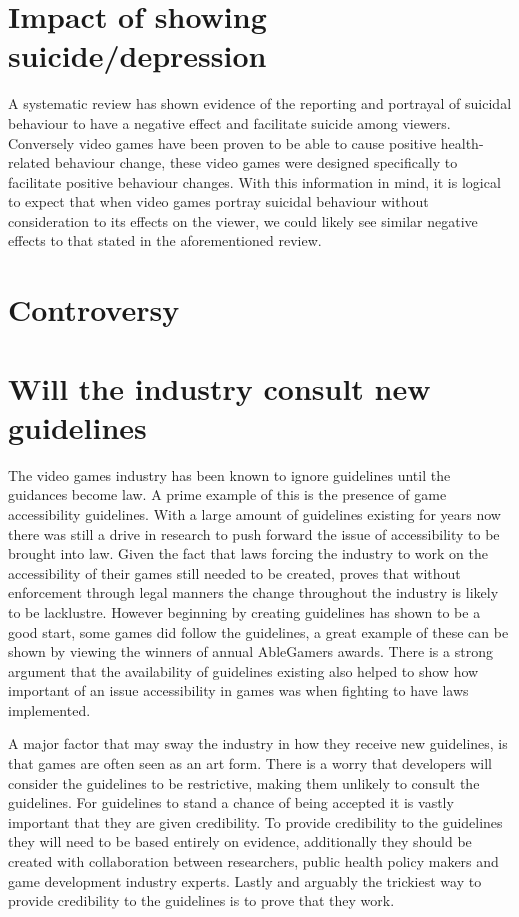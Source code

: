 \documentclass{scrartcl}
\begin{document}
	\section{Impact of showing suicide/depression}
		A systematic review\cite{pirkis2001suicide} has shown evidence of the reporting and portrayal of suicidal behaviour to have a negative effect and facilitate suicide among viewers. Conversely video games have been proven to be able to cause positive health-related behaviour change\cite{baranowski2008playing}, these video games were designed specifically to facilitate positive behaviour changes. With this information in mind, it is logical to expect that when video games portray suicidal behaviour without consideration to its effects on the viewer, we could likely see similar negative effects to that stated in the aforementioned review\cite{pirkis2001suicide}.
		
	\section{Controversy}
	\section{Will the industry consult new guidelines}
		The video games industry has been known to ignore guidelines until the guidances become law. A prime example of this is the presence of game accessibility  guidelines. With a large amount of guidelines existing for years now\cite{accessGuidelines1}\cite{accessGuidelines2} there was still a drive in research to push forward the issue of accessibility to be brought into law\cite{powers2015video}. Given the fact that laws forcing the industry to work on the accessibility of their games still needed to be created, proves that without enforcement through legal manners the change throughout the industry is likely to be lacklustre. However beginning by creating guidelines has shown to be a good start, some games did follow the guidelines, a great example of these can be shown by viewing the winners of annual AbleGamers awards\cite{ableGamers}. There is a strong argument that the availability of guidelines existing also helped to show how important of an issue accessibility in games was when fighting to have laws implemented.
		
		A major factor that may sway the industry in how they receive new guidelines, is that games are often seen as an art form\cite{pearce2006games}. There is a worry that developers will consider the guidelines to be restrictive, making them unlikely to consult the guidelines. For guidelines to stand a chance of being accepted it is vastly important that they are given credibility. To provide credibility to the guidelines they will need to be based entirely on evidence, additionally they should be created with collaboration between researchers, public health policy makers and game development industry experts\cite{hawton2002influences}. Lastly and arguably the trickiest way to  provide credibility to the guidelines is to prove that they work.
		
\end{document}
